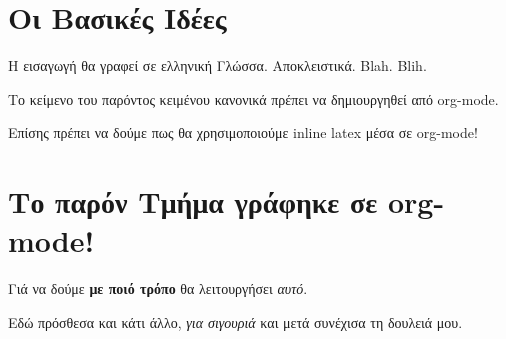 \section{Οι Βασικές Ιδέες}
Η εισαγωγή θα γραφεί σε ελληνική Γλώσσα. Αποκλειστικά. Blah. Blih.

Το κείμενο του παρόντος κειμένου κανονικά πρέπει να δημιουργηθεί από org-mode.

Επίσης πρέπει να δούμε πως θα χρησιμοποιούμε inline latex μέσα σε org-mode!

\section{Το παρόν Τμήμα γράφηκε σε org-mode!}

Γιά να δούμε \textbf{με ποιό τρόπο} θα λειτουργήσει \textit{αυτό}.

Εδώ πρόσθεσα και κάτι άλλο,  \textit{για σιγουριά} και μετά συνέχισα τη δουλειά μου.

